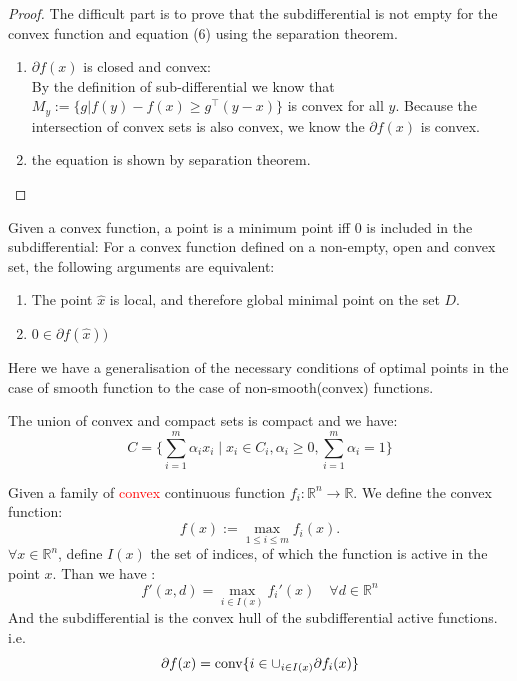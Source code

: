 \begin{proof}
	The difficult part is to prove that the subdifferential is not empty for the convex function and equation (6) using the separation theorem.
	\begin{enumerate}
		\item $\partial f(x)$ is closed and convex:\\
		By the definition of sub-differential we know that $M_y := \{g | f(y) - f(x) \geq g^\top(y - x) \}$ is convex for all $y$. Because the intersection of convex sets is also convex, we know the $\partial f(x)$ is convex.
		\item  the equation is shown by separation theorem. 
	\end{enumerate}
\end{proof}

\begin{theorem}
Given a convex function, a point is a minimum point iff 0 is included in the subdifferential: For a convex function defined on a non-empty, open and convex set, the following arguments are equivalent:
	\begin{enumerate}
		\item The point $\hat{x}$ is local, and therefore global minimal point on the set $D$.
		\item $0 \in \partial f(\hat{x}))$
	\end{enumerate}
\end{theorem}

Here we have a generalisation of the necessary conditions of optimal points in the case of smooth function to the case of non-smooth(convex) functions.

\begin{lemma}
	The union of convex and compact sets is compact and we have:
	\begin{equation*}
		C = \{ \sum_{i = 1}^m \alpha_i x_i \mid x_i \in C_i, \alpha_i \geq 0, \sum_{i = 1}^m \alpha_i = 1\}
	\end{equation*}
\end{lemma}

\begin{theorem}
Given a family of \textcolor{red}{convex} continuous function $f_i: \mathbb{R}^n \longrightarrow \mathbb{R}$. We define the convex function:
\begin{equation}
	f(x) := \max_{1\leq i \leq m} f_i(x).
\end{equation}
$\forall x \in \mathbb{R}^n$, define $I(x)$ the set of indices, of which the function is active in the point $x$. Than we have :
\begin{equation*}
	f'(x, d) = \max_{i \in I(x)} f_i'(x) \quad \forall d \in \mathbb{R}^n
\end{equation*}
And the subdifferential is the convex hull of the subdifferential active functions. i.e.
\begin{equation*}
	\partial f(x) = \operatorname*{conv} \{ i \in \cup_{i \in I(x)} \partial f_i(x)\}
\end{equation*}
\end{theorem}

